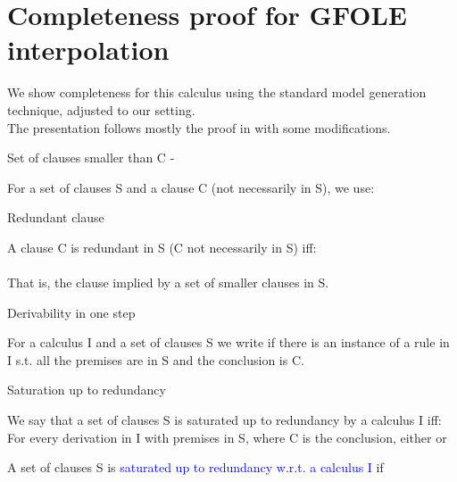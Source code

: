 \newpage
\chapter{Completeness proof for GFOLE interpolation}\label{appendix:interpolation:completeness}
We show completeness for this calculus using the standard model generation technique, adjusted to our setting.\\
The presentation follows mostly the proof in \cite{BachmairGanzingerSuperposition} with some modifications.


\begin{definition}{Set of clauses smaller than C - \m{\textcolor{blue}{S_C}}}
\label{def_4.3.0.2}

\noindent
For a set of clauses S and a clause C (not necessarily in S), we use:\\
\end{definition}

\begin{definition}{Redundant clause }
\label{def_4.3.0.3}

\noindent
A clause C is redundant in S (C not necessarily in S) iff:\\
\\
That is, the clause implied by a set of smaller clauses in S.
\end{definition}

\begin{definition}{Derivability in one step \m{\textcolor{blue}{S \vdash_I^1 C}}}
\label{def_4.3.0.4}

\noindent
For a calculus I and a set of clauses S we write  if there is an instance of a rule in I s.t. all the premises are in S and the conclusion is C.
\end{definition}

\begin{definition}{Saturation up to redundancy}
\label{def_4.3.0.7}

\noindent
We say that a set of clauses S is saturated up to redundancy by a calculus I iff:\\
For every derivation in I with premises in S, where C is the conclusion, either  or 

\noindent
A set of clauses S is \textcolor{blue}{saturated up to redundancy w.r.t. a calculus I} if \\

\end{definition}

